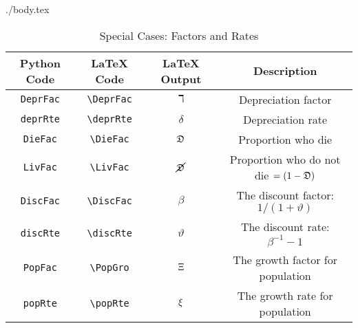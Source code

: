 \documentclass[12pt]{econtex}
\begin{document}
\begin{verbatimwrite}{./body.tex}
\newcommand{\DiscFac}{\beta}
\newcommand{\discRte}{\vartheta}
\newcommand{\deprRte}{\delta}
\newcommand{\DieFac}{\pDead}
\newcommand{\LivFac}{\Alive}
\newcommand{\PopFac}{\PopGro}
\newcommand{\popRte}{\popGro}
\begin{table}[h]
	\centering
	\begin{tabular}{||>{\ttfamily}cccc||} 		
		\hline
		 Python Code & LaTeX Code & LaTeX Output & Description \\ 
		\hline
   \texttt{DeprFac} & \verb|\DeprFac|    & $\daleth$    & Depreciation factor
\\ \texttt{deprRte} & \verb|\deprRte|    & $\deprRte$    & Depreciation rate
\\ \texttt{DieFac}  & \verb|\DieFac|     & $\DieFac$     & Proportion who die 
\\ \texttt{LivFac}  & \verb|\LivFac|     & $\LivFac$     & Proportion who do not die $=(1-\DieFac)$
\\ \texttt{DiscFac} & \verb|\DiscFac|    & $\DiscFac$    & The discount factor: $1/(1+\discRte)$
\\ \texttt{discRte} & \verb|\discRte|    & $\discRte$    & The discount rate: $\DiscFac^{-1}-1$
\\ \texttt{PopFac}  & \verb|\PopGro|     & $\Xi$     & The growth factor for population 
\\ \texttt{popRte}  & \verb|\popRte|     & $\popRte$     & The growth rate for population
\\	\hline
	\end{tabular}
	\caption{Special Cases: Factors and Rates}
	\label{table:SpecialFactors}
\end{table}	


\end{verbatimwrite}

\end{document}
